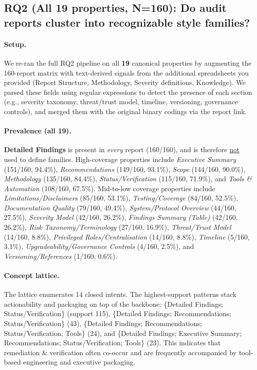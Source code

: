 
\subsection{RQ2 (All 19 properties, N=160): Do audit reports cluster into recognizable style families?}

\paragraph{Setup.} We re-ran the full RQ2 pipeline on all \textbf{19} canonical properties by
augmenting the 160-report matrix with text-derived signals from the additional spreadsheets you provided
(Report Structure, Methodology, Severity definitions, Knowledge). We parsed these fields using
regular expressions to detect the presence of each section (e.g., severity taxonomy, threat/trust model,
timeline, versioning, governance controls), and merged them with the original binary codings via the report link.

\paragraph{Prevalence (all 19).} \textbf{Detailed Findings} is present in \emph{every} report (160/160), and is therefore
\underline{not} used to define families. High-coverage properties include \emph{Executive Summary} (151/160, 94.4\%),
\emph{Recommendations} (149/160, 93.1\%), \emph{Scope} (144/160, 90.0\%), \emph{Methodology} (135/160, 84.4\%),
\emph{Status/Verification} (115/160, 71.9\%), and \emph{Tools \& Automation} (108/160, 67.5\%). Mid-to-low coverage properties
include \emph{Limitations/Disclaimers} (85/160, 53.1\%), \emph{Testing/Coverage} (84/160, 52.5\%), \emph{Documentation Quality} (79/160, 49.4\%),
\emph{System/Protocol Overview} (44/160, 27.5\%), \emph{Severity Model} (42/160, 26.2\%), \emph{Findings Summary (Table)} (42/160, 26.2\%),
\emph{Risk Taxonomy/Terminology} (27/160, 16.9\%), \emph{Threat/Trust Model} (14/160, 8.8\%), \emph{Privileged Roles/Centralisation} (14/160, 8.8\%),
\emph{Timeline} (5/160, 3.1\%), \emph{Upgradeability/Governance Controls} (4/160, 2.5\%), and \emph{Versioning/References} (1/160, 0.6\%).

\paragraph{Concept lattice.} The lattice enumerates 14 closed intents. The highest-support patterns stack actionability and packaging on
top of the backbone: \{Detailed Findings; Status/Verification\} (support 115), \{Detailed Findings; Recommendations; Status/Verification\} (43),
\{Detailed Findings; Recommendations; Status/Verification; Tools\} (24), and \{Detailed Findings; Executive Summary; Recommendations; Status/Verification; Tools\} (23).
This indicates that remediation \& verification often co-occur and are frequently accompanied by tool-based engineering and executive packaging.

